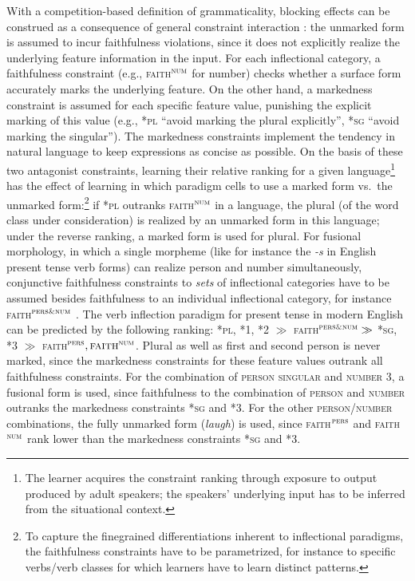 \documentclass[output=paper,hidelinks]{langscibook}
\begin{document}
With a competition-based definition of grammaticality, blocking effects can be construed as a consequence of general constraint interaction \citep{Bresnan-Lexicon-in-OT,Bresnan-Explaining-Morphosyntactic}: the unmarked form is assumed to incur faithfulness violations, since it does not explicitly realize the underlying feature information in the input. For each inflectional category, a faithfulness constraint (e.g., \textsc{faith}$^\textsc{num}$ for number) checks whether a surface form accurately marks the underlying feature. On the other hand, a markedness constraint is assumed for each specific feature value, punishing the explicit marking of this value (e.g., \textsc{*pl} ``avoid marking the plural explicitly'', \textsc{*sg} ``avoid marking the singular''). The markedness constraints implement the tendency in natural language to keep expressions as concise as possible. On the basis of these two antagonist constraints, learning their relative ranking for a given language\footnote{The learner acquires the constraint ranking through exposure to output produced by adult speakers; the speakers' underlying input has to be inferred from the situational context. %
} has the effect of learning in which paradigm cells to use a marked form vs.\ the unmarked form:\footnote{To capture the finegrained differentiations inherent to inflectional paradigms, the faithfulness constraints have to be parametrized, for instance to specific verbs/verb classes for which learners have to learn distinct patterns.} %
if \textsc{*pl} outranks \textsc{faith}$^\textsc{num}$ in a language, the plural (of the word class under consideration) is realized by an unmarked form in this language; under the reverse ranking, a marked form is used for plural.  For fusional morphology, in which a single morpheme (like for instance the \emph{-s} in English present tense verb forms) can realize person and number simultaneously, conjunctive faithfulness constraints to \emph{sets} of inflectional categories have to be assumed  besides faithfulness to an individual inflectional category, for instance \textsc{faith}$^\textsc{pers\&num}$ \citep[ex.~22]{Bresnan-Explaining-Morphosyntactic}. The verb inflection paradigm for present tense in modern English can be predicted by the following ranking: \textsc{*pl, *1, *2} $\gg$ \textsc{faith}$^\textsc{pers\&num} \gg$ \textsc{*sg, *3} $\gg$ \textsc{faith}$^\textsc{pers}, \textsc{faith}^\textsc{num}$. Plural as well as first and second person is never marked, since the markedness constraints for these feature values outrank all faithfulness constraints. For the combination of \textsc{person singular} and \textsc{number 3}, a fusional form is used, since faithfulness to the combination of \textsc{person} and \textsc{number} outranks the markedness constraints \textsc{*sg} and \textsc{*3}. For the other \textsc{person}/\textsc{number} combinations, the fully unmarked form (\emph{laugh}) is used, since \textsc{faith}$^\textsc{pers}$ and \textsc{faith}$^\textsc{num}$ rank lower than the markedness constraints \textsc{*sg} and \textsc{*3}.
\end{document}

